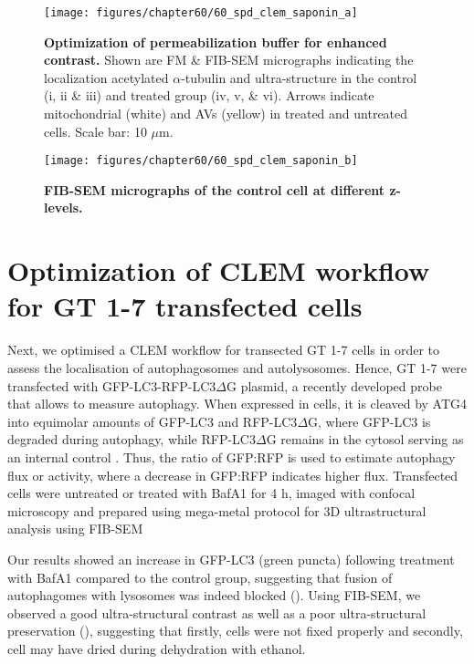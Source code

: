 \begin{landscape}
\begin{figure}[!htbp]
\center
  \texttt{[image: figures/chapter60/60\_spd\_clem\_saponin\_a]}
  \caption[Optimization of permeabilization buffer for enhanced contrast]{\textbf{Optimization of permeabilization buffer for enhanced contrast.} Shown are FM \& FIB-SEM micrographs indicating the localization acetylated $\alpha$-tubulin and ultra-structure in the control (i, ii \& iii) and treated group (iv, v, \& vi). Arrows indicate mitochondrial (white) and AVs (yellow) in treated and untreated cells. Scale bar: 10 $\mu$m.}
  \label{fig:60_spd_clem_saponin_a}
\end{figure} 
\end{landscape}

\begin{landscape}
\begin{figure}[!htbp]
\center
  \texttt{[image: figures/chapter60/60\_spd\_clem\_saponin\_b]}
  \caption[FIB-SEM micrographs of the control cell at different z-levels]{\textbf{FIB-SEM micrographs of the control cell at different z-levels.}}
  \label{fig:60_spd_clem_saponin_b}
\end{figure} 
\end{landscape}

\section{Optimization of CLEM workflow for GT 1-7 transfected cells}
Next, we optimised a CLEM workflow for transected GT 1-7 cells in order to assess the localisation of autophagosomes and autolysosomes. Hence, GT 1-7 were transfected with GFP-LC3-RFP-LC3$\Delta$G plasmid, a recently developed probe that allows to measure autophagy. When expressed in cells, it is cleaved by ATG4 into equimolar amounts of GFP-LC3 and RFP-LC3$\Delta$G, where GFP-LC3 is degraded during autophagy, while RFP-LC3$\Delta$G remains in the cytosol serving as an internal control \citep{Kaizuka2016}. Thus, the ratio of GFP:RFP is used to estimate autophagy flux or activity, where a decrease in GFP:RFP indicates higher flux. Transfected cells were untreated or treated with BafA1 for 4 h, imaged with confocal microscopy and prepared using mega-metal protocol for 3D ultrastructural analysis using FIB-SEM

Our results showed an increase in GFP-LC3 (green puncta) following treatment with BafA1 compared to the control group, suggesting that fusion of autophagomes with lysosomes was indeed blocked (). Using FIB-SEM, we observed a good ultra-structural contrast as well as a poor ultra-structural preservation (), suggesting that firstly, cells were not fixed properly and secondly, cell may have dried during dehydration with ethanol. 

